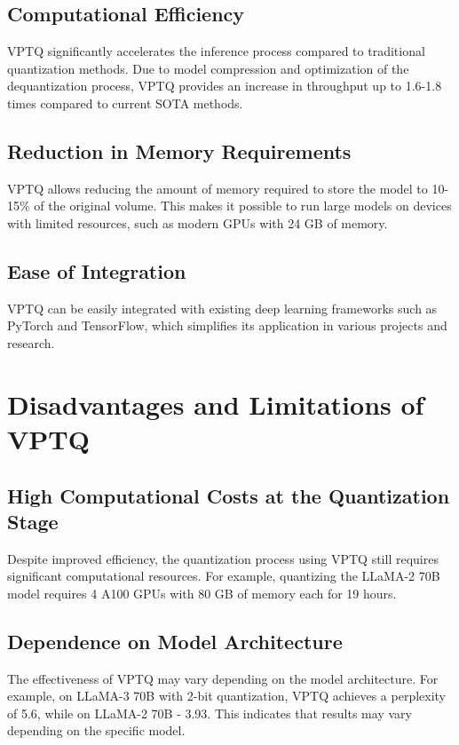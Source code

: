 \documentclass{article}
\begin{document}
\subsection{Computational Efficiency}
VPTQ significantly accelerates the inference process compared to traditional quantization methods. Due to model compression and optimization of the dequantization process, VPTQ provides an increase in throughput up to 1.6-1.8 times compared to current SOTA methods.

\subsection{Reduction in Memory Requirements}
VPTQ allows reducing the amount of memory required to store the model to 10-15\% of the original volume. This makes it possible to run large models on devices with limited resources, such as modern GPUs with 24 GB of memory.

\subsection{Ease of Integration}
VPTQ can be easily integrated with existing deep learning frameworks such as PyTorch and TensorFlow, which simplifies its application in various projects and research.

\section{Disadvantages and Limitations of VPTQ}

\subsection{High Computational Costs at the Quantization Stage}
Despite improved efficiency, the quantization process using VPTQ still requires significant computational resources. For example, quantizing the LLaMA-2 70B model requires 4 A100 GPUs with 80 GB of memory each for 19 hours.

\subsection{Dependence on Model Architecture}
The effectiveness of VPTQ may vary depending on the model architecture. For example, on LLaMA-3 70B with 2-bit quantization, VPTQ achieves a perplexity of 5.6, while on LLaMA-2 70B - 3.93. This indicates that results may vary depending on the specific model.
\end{document}
